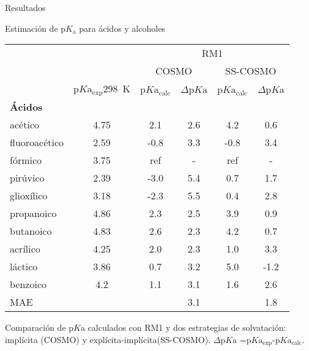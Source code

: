 \documentclass[aspectratio=169, hyperref={pdfpagelabels=false}]{beamer}
\begin{document}
\begin{frame}[shrink=25]{Resultados}
    \centering
    \begin{threeparttable}
        \caption{Estimación de p$K_\text{a}$ para ácidos y alcoholes}\label{table:estimacion_pka_RM1}
        \begin{tabular}{lccccc}
            \toprule
             & \textbf{} & \multicolumn{4}{c}{RM1} \\  \cmidrule(lr){3-6}
             &  & \multicolumn{2}{c}{COSMO} & \multicolumn{2}{c}{SS-COSMO} \\  \cmidrule(lr){3-4}\cmidrule(lr){5-6}
             & p$K\text{a}_{\text{exp}}$\SI{298}{K} & p$K\text{a}_{\text{calc}}$ & $\Delta$p$K\text{a}$ & p$K\text{a}_{\text{calc}}$ & $\Delta$p$K\text{a}$ \\  \midrule
            \textbf{Ácidos}&  &  &  &  &  \\  
            acético & 4.75 & 2.1 & 2.6 & 4.2 & 0.6 \\  
            fluoroacético & 2.59 & -0.8 & 3.3 & -0.8 & 3.4 \\  
            fórmico & 3.75 & ref & - & ref & - \\  
            pirúvico & 2.39 & -3.0 & 5.4 & 0.7 & 1.7 \\  
            glioxílico & 3.18 & -2.3 & 5.5 & 0.4 & 2.8 \\  
            propanoico & 4.86 & 2.3 & 2.5 & 3.9 & 0.9 \\  
            butanoico & 4.83 & 2.6 & 2.3 & 4.2 & 0.7 \\  
            acrílico & 4.25 & 2.0 & 2.3 & 1.0 & 3.3 \\  
            láctico & 3.86 & 0.7 & 3.2 & 5.0 & -1.2 \\  
            benzoico & 4.2 & 1.1 & 3.1 & 1.6 & 2.6 \\  
            MAE &  &  & 3.1 &  & 1.8 \\  \bottomrule
        \end{tabular}
        \begin{tablenotes}
            \footnotesize
            \item {Comparación de p$K\text{a}$ calculados con RM1 y dos estrategias de solvatación: implícita (COSMO) y explícita-implícita(SS-COSMO). $\Delta$p$K\text{a}$ =p$K\text{a}_{\text{exp}}$-p$K\text{a}_{\text{calc}}$.}
        \end{tablenotes}
    \end{threeparttable}
\end{frame}
\end{document}
